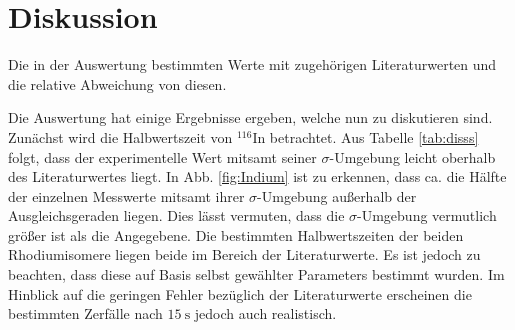 
\section{Diskussion}
\label{sec:Diskussion}
\begin{table}
	\centering
	\caption{Die in der Auswertung bestimmten Werte mit zugehörigen Literaturwerten und die relative Abweichung von diesen.}
	
	\label{tab:disss}
\end{table}
Die Auswertung hat einige Ergebnisse ergeben, welche nun zu diskutieren sind. Zunächst wird die Halbwertszeit von $^{116}$In betrachtet. Aus  Tabelle \ref{tab:disss} folgt, dass der experimentelle Wert mitsamt seiner $\sigma$-Umgebung leicht oberhalb des Literaturwertes liegt. In Abb. \ref{fig:Indium} ist zu erkennen, dass ca. die Hälfte der einzelnen Messwerte mitsamt ihrer $\sigma$-Umgebung außerhalb der Ausgleichsgeraden liegen. Dies lässt vermuten, dass die $\sigma$-Umgebung vermutlich größer ist als die Angegebene.
 Die bestimmten Halbwertszeiten der beiden Rhodiumisomere liegen beide im Bereich der Literaturwerte. Es ist jedoch zu beachten, dass diese auf Basis selbst gewählter Parameters bestimmt wurden. Im Hinblick auf die geringen Fehler bezüglich der Literaturwerte erscheinen die bestimmten Zerfälle nach $\SI{15}{\second}$ jedoch auch realistisch.  

